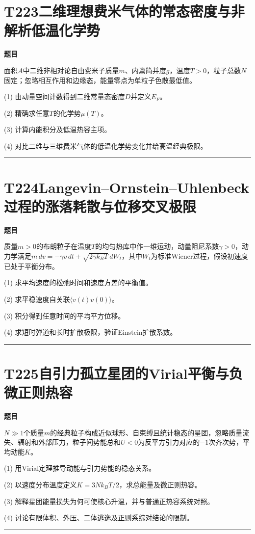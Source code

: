 \documentclass[UTF8,a4paper,11pt,oneside,openany]{ctexbook}
\begin{document}
\section*{T223\quad 二维理想费米气体的常态密度与非解析低温化学势}
\textbf{题目}\par
面积$A$中二维非相对论自由费米子质量$m$、内禀简并度$g$，温度$T>0$，粒子总数$N$固定；忽略相互作用和边缘态，能量零点为单粒子色散最低值。
\par\smallskip\noindent (1) 由动量空间计数得到二维常量态密度$D$并定义$E_F$。
\par\smallskip\noindent (2) 精确求任意$T$的化学势$\mu(T)$。
\par\smallskip\noindent (3) 计算内能积分及低温热容主项。
\par\smallskip\noindent (4) 对比二维与三维费米气体的低温化学势变化并给高温经典极限。
\par\medskip\hrule\medskip
\section*{T224\quad Langevin–Ornstein–Uhlenbeck过程的涨落耗散与位移交叉极限}
\textbf{题目}\par
质量$m>0$的布朗粒子在温度$T$的均匀热库中作一维运动，动量阻尼系数$\gamma>0$，动力学满足$m\,dv=-\gamma v\,dt+\sqrt{2\gamma k_BT}\,dW_t$，其中$W_t$为标准Wiener过程，假设初速度已处于平衡分布。
\par\smallskip\noindent (1) 求平均速度的松弛时间和速度方差的平衡值。
\par\smallskip\noindent (2) 求平稳速度自关联$\langle v(t)v(0)\rangle$。
\par\smallskip\noindent (3) 积分得到任意时间的平均平方位移。
\par\smallskip\noindent (4) 求短时弹道和长时扩散极限，验证Einstein扩散系数。
\par\medskip\hrule\medskip
\section*{T225\quad 自引力孤立星团的Virial平衡与负微正则热容}
\textbf{题目}\par
$N\gg1$个质量$m$的经典粒子构成近似球形、自束缚且统计稳态的星团，忽略质量流失、辐射和外部压力，粒子间势能总和$U<0$为反平方引力对应的$-1$次齐次势，平均动能$K$。
\par\smallskip\noindent (1) 用Virial定理推导动能与引力势能的稳态关系。
\par\smallskip\noindent (2) 以速度分布温度定义$K=3Nk_BT/2$，求总能量及微正则热容。
\par\smallskip\noindent (3) 解释星团能量损失为何可使核心升温，并与普通正热容系统对照。
\par\smallskip\noindent (4) 讨论有限体积、外压、二体逃逸及正则系综对结论的限制。
\par\medskip\hrule\medskip
\end{document}
